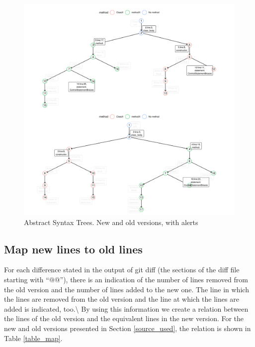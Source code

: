 \documentclass[
]{article}
\begin{document}
\begin{figure}[H]
\includegraphics[width=1\linewidth]{report_files/figure-latex/unnamed-chunk-5-1} \caption{Abstract Syntax Trees. New and old versions, with alerts \label{AST_compare_id_alerts}}\label{fig:unnamed-chunk-5}
\end{figure}

\normalsize

\subsection{Map new lines to old lines}\label{map}

For each difference stated in the output of git diff (the sections of
the diff file starting with ``@@''), there is an indication of the
number of lines removed from the old version and the number of lines
added to the new one. The line in which the lines are removed from the
old version and the line at which the lines are added is indicated,
too.\textbackslash{} By using this information we create a relation
between the lines of the old version and the equivalent lines in the new
version. For the new and old versions presented in Section
\ref{source_used}, the relation is shown in Table \ref{table_map}.

\small

\begin{table}[H]

\caption{\label{tab:showing map}Relation between lines of the old version and lines of the new version\label{table_map}}
\centering
{}
\end{table}
\end{document}
